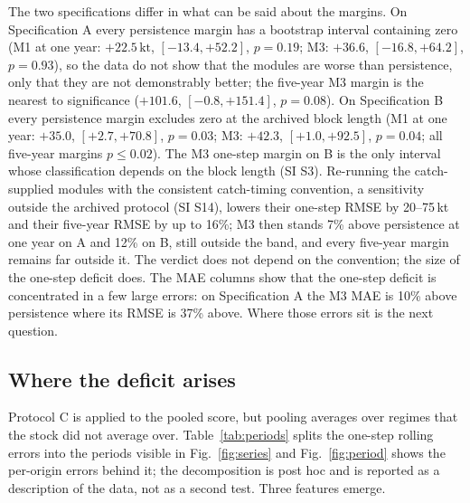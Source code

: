 \documentclass[preprint,11pt,authoryear]{elsarticle}
\theoremstyle{definition}
\theoremstyle{remark}
\newcommand{\kt}{\,\mathrm{kt}}
\begin{document}
The two specifications differ in what can be said about the margins. On Specification A every persistence margin has a bootstrap interval containing zero (M1 at one year: $+22.5\kt$, $[-13.4, +52.2]$, $p=0.19$; M3: $+36.6$, $[-16.8, +64.2]$, $p=0.93$), so the data do not show that the modules are worse than persistence, only that they are not demonstrably better; the five-year M3 margin is the nearest to significance ($+101.6$, $[-0.8, +151.4]$, $p=0.08$). On Specification B every persistence margin excludes zero at the archived block length (M1 at one year: $+35.0$, $[+2.7, +70.8]$, $p=0.03$; M3: $+42.3$, $[+1.0, +92.5]$, $p=0.04$; all five-year margins $p\le 0.02$). The M3 one-step margin on B is the only interval whose classification depends on the block length (SI S3). Re-running the catch-supplied modules with the consistent catch-timing convention, a sensitivity outside the archived protocol (SI S14), lowers their one-step RMSE by 20--75\,kt and their five-year RMSE by up to 16\%; M3 then stands 7\% above persistence at one year on A and 12\% on B, still outside the band, and every five-year margin remains far outside it. The verdict does not depend on the convention; the size of the one-step deficit does. The MAE columns show that the one-step deficit is concentrated in a few large errors: on Specification A the M3 MAE is 10\% above persistence where its RMSE is 37\% above. Where those errors sit is the next question.

\FloatBarrier
\subsection{Where the deficit arises}\label{sec:periods}

Protocol C is applied to the pooled score, but pooling averages over regimes that the stock did not average over. Table~\ref{tab:periods} splits the one-step rolling errors into the periods visible in Fig.~\ref{fig:series} and Fig.~\ref{fig:period} shows the per-origin errors behind it; the decomposition is post hoc and is reported as a description of the data, not as a second test. Three features emerge.
\end{document}
